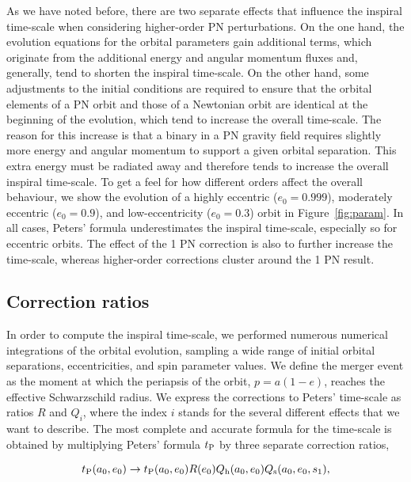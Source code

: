 \documentclass[usenatbib]{mnras}
\begin{document}
As we have noted before, there are two separate effects that influence the inspiral time-scale when considering higher-order PN perturbations. On the one hand, the evolution equations for the orbital parameters gain additional terms, which originate from the additional energy and angular momentum fluxes and, generally, tend to shorten the inspiral time-scale. On the other hand, some adjustments to the initial conditions are required to ensure that the orbital elements of a PN orbit and those of a Newtonian orbit are identical at the beginning of the evolution, which tend to increase the overall time-scale. The reason for this increase is that a binary in a PN gravity field requires slightly more energy and angular momentum to support a given orbital separation. This extra energy must be radiated away and therefore tends to increase the overall inspiral time-scale. To get a feel for how different orders affect the overall behaviour, we show the evolution of a highly eccentric ($e_0=0.999$), moderately eccentric ($e_0=0.9$), and low-eccentricity ($e_0=0.3$) orbit in Figure~\ref{fig:param}. In all cases, Peters' formula underestimates the inspiral time-scale, especially so for eccentric orbits. The effect of the 1 PN correction is also to further increase the time-scale, whereas higher-order corrections cluster around the 1 PN result.

\subsection{Correction ratios}\label{sec:CorrectionRatios}

In order to compute the inspiral time-scale, we performed numerous numerical integrations of the orbital evolution, sampling a wide range of initial orbital separations, eccentricities, and spin parameter values. We define the merger event as the moment at which the periapsis of the orbit, $p = a(1-e)$, reaches the effective Schwarzschild radius. We express the corrections to Peters' time-scale as ratios $R$ and $Q_{i}$, where the index $i$ stands for the several different effects that we want to describe. The most complete and accurate formula for the time-scale is obtained by multiplying Peters' formula $t_{\rm P}$ by three separate correction ratios,

\begin{align}
    t_{\rm P}(a_0,e_0) \to t_{\rm P}(a_0,e_0)R(e_0) Q_{\rm h}(a_0,e_0) Q_{\rm s}(a_0,e_0,s_1), \\ \nonumber
\end{align}
\end{document}
